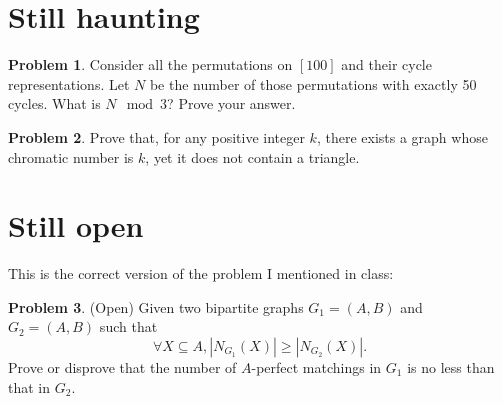 \documentclass[12pt]{article}
\theoremstyle{definition}
\newtheorem{hw}{Problem}
\begin{document}
\section{Still haunting}

\begin{hw}
Consider all the permutations on $[100]$ and their cycle
representations.
Let $N$ be the number of those permutations with
exactly 50 cycles. What is $N \mod 3$? Prove your answer.
\end{hw}

\begin{hw}
Prove that, for any positive integer $k$, there exists
a graph whose chromatic number is $k$, yet it does not
contain a triangle.
\end{hw}

\section{Still open}

This is the correct version of the problem I mentioned in class:

\begin{hw} (Open) Given two bipartite graphs $G_1 = (A, B)$ and $G_2 = (A, B)$ such that
  \[ \forall X \subseteq A, |N_{G_1}(X)| \geq |N_{G_2}(X)|.\]
Prove or disprove that the number of $A$-perfect matchings in $G_1$ is no less than that in $G_2$.
\end{hw}
\end{document}
